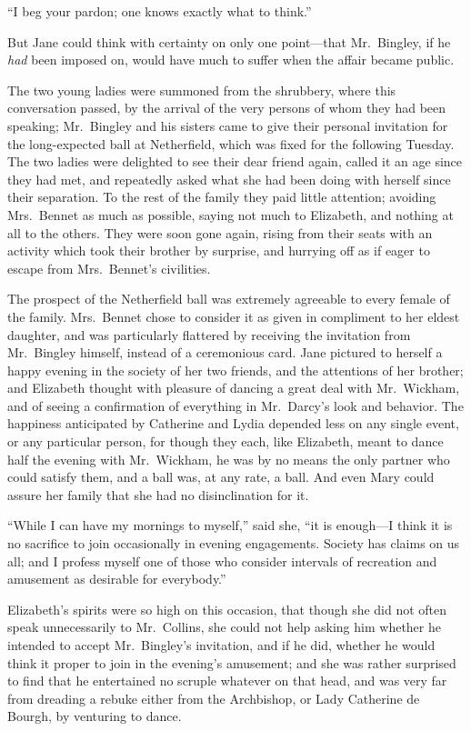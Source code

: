 \documentclass[12pt,english,oneside]{book}
\begin{document}
{}``I beg your pardon; one knows exactly what to think.''

But Jane could think with certainty on only one point\mbox{---}that
Mr.\ Bingley, if he \textit{had} been imposed on, would have much
to suffer when the affair became public.

The two young ladies were summoned from the shrubbery, where this
conversation passed, by the arrival of the very persons of whom they
had been speaking; Mr.\ Bingley and his sisters came to give their
personal invitation for the long-expected ball at Netherfield, which
was fixed for the following Tuesday. The two ladies were delighted
to see their dear friend again, called it an age since they had met,
and repeatedly asked what she had been doing with herself since their
separation. To the rest of the family they paid little attention;
avoiding Mrs.\ Bennet as much as possible, saying not much to Elizabeth,
and nothing at all to the others. They were soon gone again, rising
from their seats with an activity which took their brother by surprise,
and hurrying off as if eager to escape from Mrs.\ Bennet's civilities.

The prospect of the Netherfield ball was extremely agreeable to every
female of the family. Mrs.\ Bennet chose to consider it as given
in compliment to her eldest daughter, and was particularly flattered
by receiving the invitation from Mr.\ Bingley himself, instead of
a ceremonious card. Jane pictured to herself a happy evening in the
society of her two friends, and the attentions of her brother; and
Elizabeth thought with pleasure of dancing a great deal with Mr.\ Wickham,
and of seeing a confirmation of everything in Mr.\ Darcy's look and
behavior. The happiness anticipated by Catherine and Lydia depended
less on any single event, or any particular person, for though they
each, like Elizabeth, meant to dance half the evening with Mr.\ Wickham,
he was by no means the only partner who could satisfy them, and a
ball was, at any rate, a ball. And even Mary could assure her family
that she had no disinclination for it.

{}``While I can have my mornings to myself,'' said she, {}``it
is enough\mbox{---}I think it is no sacrifice to join occasionally
in evening engagements. Society has claims on us all; and I profess
myself one of those who consider intervals of recreation and amusement
as desirable for everybody.''

Elizabeth's spirits were so high on this occasion, that though she
did not often speak unnecessarily to Mr.\ Collins, she could not
help asking him whether he intended to accept Mr.\ Bingley's invitation,
and if he did, whether he would think it proper to join in the evening's
amusement; and she was rather surprised to find that he entertained
no scruple whatever on that head, and was very far from dreading a
rebuke either from the Archbishop, or Lady Catherine de Bourgh, by
venturing to dance.
\end{document}
